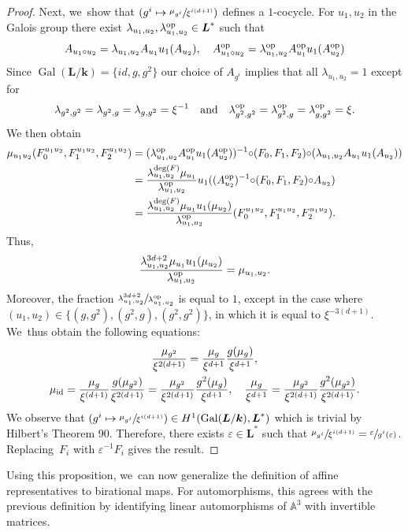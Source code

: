 \documentclass[JEP,XML,SOM,Unicode,NoFloatCountersInSection, NoEqCountersInSection,published]{cedram}
\newcommand\mto{\mathchoice{\longmapsto}{\mapsto}{\mapsto}{\mapsto}}
\newcommand{\id}{\textup{id}}
\newcommand{\op}{\textup{op}}
\newcommand{\quand}{\quad\text{and}\quad}
\DeclareMathOperator{\Gal}{Gal}
\let\epsilon\varepsilon
\theoremstyle{definition}
\newcommand{\kk}{{\boldsymbol{k}}}
\newcommand{\LL}{{\boldsymbol{L}}}
\begin{document}
\begin{proof}
Next, we~show that $(g^{i} \mto \sfrac{\mu_{g^i}}{\xi^{i(d+1)}})$ defines a $1$-cocycle.
For $u_1,u_2$ in the Galois group there exist $\lambda_{u_1,u_2}, \lambda_{u_1,u_2}^{\op} \in \LL^*$ such that
\[
A_{u_1 \circ u_2} = \lambda_{u_1,u_2} A_{u_1} u_1(A_{u_2}), \quad A_{u_1 \circ u_2}^{\op} = \lambda_{u_1,u_2}^{\op} A_{u_1}^{\op} u_1(A_{u_2}^{\op})
\]
Since $\Gal(\LL/\kk) = \{id,g,g^2 \}$ our choice of $A_{g^i}$ implies that all $\lambda_{u_1,u_2} = 1$ except for
\[
\lambda_{g^2,g^2} = \lambda_{g^2,g} = \lambda_{g,g^2} = \xi^{-1}
\quand
\lambda_{g^2,g^2}^{\op} = \lambda_{g^2,g}^{\op} =\lambda_{g,g^2}^{\op} = \xi.
\]
We then obtain
\begin{align*}
\mu_{u_1u_2}(F_0^{u_1u_2},F_1^{u_1u_2},F_2^{u_1u_2}) &= (\lambda_{u_1,u_2}^{\op} A_{u_1}^{\op} u_1(A_{u_2}^{\op}))^{-1} {\circ} (F_0,F_1,F_2) {\circ} (\lambda_{u_1,u_2} A_{u_1} u_1(A_{u_2}))
\\&
= \frac{\lambda_{u_1,u_2}^{\deg(F)} \mu_{u_1}}{\lambda_{u_1,u_2}^{\op}} u_1((A_{u_2}^{\op})^{-1} {\circ} (F_0, F_1, F_2) {\circ} A_{u_2})
\\&
= \frac{\lambda_{u_1,u_2}^{\deg(F)} \mu_{u_1} u_1(\mu_{u_2})}{\lambda_{u_1,u_2}^{\op}} (F_0^{u_1u_2},F_1^{u_1u_2},F_2^{u_1u_2}).
\end{align*}
Thus,
\[
\frac{\lambda_{u_1,u_2}^{3d + 2} \mu_{u_1} u_1(\mu_{u_2})}{\lambda_{u_1,u_2}^{\op}} = \mu_{u_1,u_2}.
\]
Moreover, the fraction $\sfrac{\lambda_{u_1,u_2}^{3d + 2}}{\lambda_{u_1,u_2}^{\op}}$ is equal to $1$, except in the case where $(u_1,u_2) \in \{ (g,g^2), (g^2,g),(g^2,g^2) \}$, in which it is equal to $\xi^{-3(d+1)}$. We~thus obtain the following equations:
\begin{gather*}
\frac{\mu_{g^2}}{\xi^{2(d+1)}} = \frac{\mu_g}{\xi^{d+1}} \frac{g(\mu_g)}{\xi^{d+1}},
\\
\mu_{\id} = \frac{\mu_g}{\xi^{(d+1)}} \frac{g(\mu_{g^2})}{\xi^{2(d+1)}} = \frac{\mu_{g^2}}{\xi^{2(d+1)}} \frac{g^2(\mu_g)}{\xi^{d+1}}, \quad \frac{\mu_g}{\xi^{d+1}} = \frac{\mu_{g^2}}{\xi^{2(d+1)}}\frac{g^2(\mu_{g^2})}{\xi^{2(d+1)}}.
\end{gather*}
We observe that $(g^{i} \mto \sfrac{\mu_{g^i}}{\xi^{i(d+1)}}) \in H^1(\Gal(\LL/\kk),\LL^*)$ which is trivial by Hilbert's Theorem 90. Therefore, there exists $\epsilon \in \LL^*$ such that $\sfrac{\mu_{g^{i}}}{ \xi^{i(d+1)}} = \sfrac{\epsilon}{g^{i}(\epsilon)}$. Replacing~$F_i$ with $\epsilon^{-1} F_i$ gives the result.
\end{proof}
Using this proposition, we~can now generalize the definition of affine representatives to birational maps. For automorphisms, this agrees with the previous definition by identifying linear automorphisms of $\mathbb{A}^3$ with invertible matrices.
\end{document}
